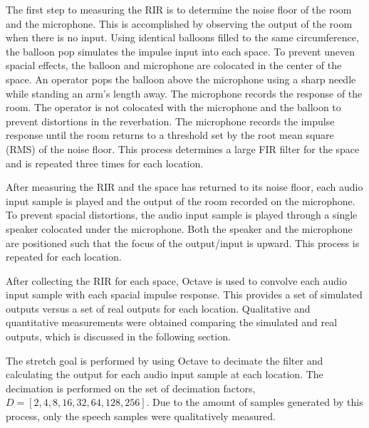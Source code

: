\documentclass[letterpaper, 11pt, onecolumn, oneside]{article}
\begin{document}
The first step to measuring the RIR is to determine the noise floor of the room and the microphone.
This is accomplished by observing the output of the room when there is no input.
Using identical balloons filled to the same circumference, the balloon pop simulates the impulse input into each space.
To prevent uneven spacial effects, the balloon and microphone are colocated in the center of the space.
An operator pops the balloon above the microphone using a sharp needle while standing an arm's length away.
The microphone records the response of the room.
The operator is not colocated with the microphone and the balloon to prevent distortions in the reverbation.
The microphone records the impulse response until the room returns to a threshold set by the root mean square (RMS) of the noise floor.
This process determines a large FIR filter for the space and is repeated three times for each location.

After measuring the RIR and the space has returned to its noise floor, each audio input sample is played and the output of the room recorded on the microphone.
To prevent spacial distortions, the audio input sample is played through a single speaker colocated under the microphone.
Both the speaker and the microphone are positioned such that the focus of the output/input is upward.
This process is repeated for each location.

After collecting the RIR for each space, Octave is used to convolve each audio input sample with each spacial impulse response.
This provides a set of simulated outputs versus a set of real outputs for each location.
Qualitative and quantitative measurements were obtained comparing the simulated and real outputs, which is discussed in the following section.

The stretch goal is performed by using Octave to decimate the filter and calculating the output for each audio input sample at each location.
The decimation is performed on the set of decimation factors, $D = [2, 4, 8, 16, 32, 64, 128, 256]$.
Due to the amount of samples generated by this process, only the speech samples were qualitatively measured.

\end{document}
